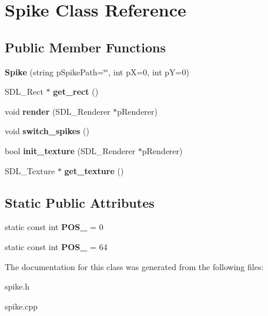 \hypertarget{classSpike}{}\section{Spike Class Reference}
\label{classSpike}
\subsection*{Public Member Functions}
\begin{DoxyCompactItemize}
\item 
\mbox{\label{classSpike_a4c463d70ecce668d1f248718ca53eb5a}} 
{\bfseries Spike} (string p\+Spike\+Path=\char`\"{}\char`\"{}, int pX=0, int pY=0)
\item 
\mbox{\label{classSpike_a46feda850d882f64144b1f7d48c47fd0}} 
S\+D\+L\+\_\+\+Rect $\ast$ {\bfseries get\+\_\+rect} ()
\item 
\mbox{\label{classSpike_a719ac273421367066615585ef559ba25}} 
void {\bfseries render} (S\+D\+L\+\_\+\+Renderer $\ast$p\+Renderer)
\item 
\mbox{\label{classSpike_a251a4ae62efbc5db696f5b67127b8df3}} 
void {\bfseries switch\+\_\+spikes} ()
\item 
\mbox{\label{classSpike_a7efe68c86948edf53e23ccad98de3605}} 
bool {\bfseries init\+\_\+texture} (S\+D\+L\+\_\+\+Renderer $\ast$p\+Renderer)
\item 
\mbox{\label{classSpike_acd8f9e7955d340cda35a2ace616554eb}} 
S\+D\+L\+\_\+\+Texture $\ast$ {\bfseries get\+\_\+texture} ()
\end{DoxyCompactItemize}
\subsection*{Static Public Attributes}
\begin{DoxyCompactItemize}
\item 
\mbox{\label{classSpike_af83ddeb62a511e7712a551596b5a78ac}} 
static const int {\bfseries P\+O\+S\+\_} = 0
\item 
\mbox{\label{classSpike_a87df7e006731ad3d5d166aee88079b46}} 
static const int {\bfseries P\+O\+S\+\_} = 64
\end{DoxyCompactItemize}


The documentation for this class was generated from the following files\+:\begin{DoxyCompactItemize}
\item 
spike.\+h\item 
spike.\+cpp\end{DoxyCompactItemize}
